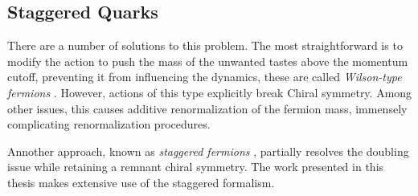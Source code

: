 
    \subsection{Staggered Quarks}
    \label{sec:staggeredquarks}

    There are a number of solutions to this problem. The most straightforward is to modify the action to push the mass of the unwanted tastes above the momentum cutoff, preventing it from influencing the dynamics, these are called \textit{Wilson-type fermions} \cite{Wilson:1974sk}. However, actions of this type explicitly break Chiral symmetry. Among other issues, this causes additive renormalization of the fermion mass, immensely complicating renormalization procedures.

    Annother approach, known as \textit{staggered fermions} \cite{Kogut:1974ag}, partially resolves the doubling issue while retaining a remnant chiral symmetry. The work presented in this thesis makes extensive use of the staggered formalism.


